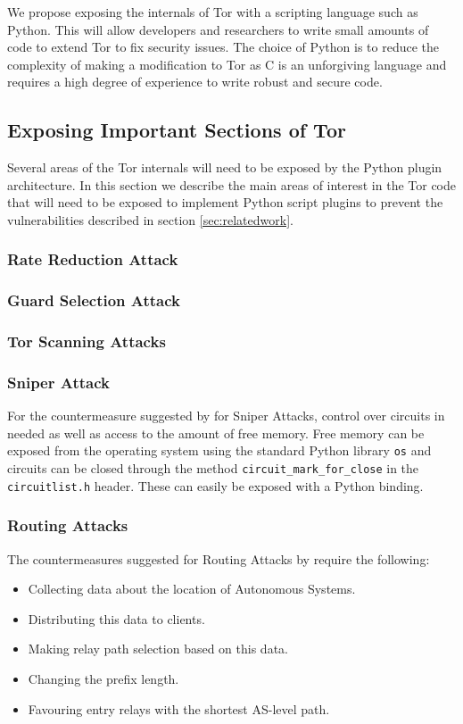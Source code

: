 \documentclass[9pt,technote]{IEEEtran}
\begin{document}
We propose exposing the internals of Tor with a scripting language such as
Python. This will allow developers and researchers to write small amounts of
code to extend Tor to fix security issues. The choice of Python is to reduce the complexity of making a modification to Tor as C is an unforgiving language and requires a high degree of experience to write robust and secure code.

\subsection{Exposing Important Sections of Tor}
Several areas of the Tor internals will need to be exposed by the Python plugin
architecture. In this section we describe the main areas of interest in the Tor
code that will need to be exposed to implement Python script plugins to prevent
the vulnerabilities described in section \ref{sec:relatedwork}.\\

\subsubsection{Rate Reduction Attack}

\subsubsection{Guard Selection Attack}

\subsubsection{Tor Scanning Attacks}

\subsubsection{Sniper Attack}
For the countermeasure suggested by \citeauthor{jansen2014sniper} for Sniper Attacks, control over circuits in needed as well as access to the amount of free memory. Free memory can be exposed from the operating system using the standard Python library \texttt{os} and circuits can
be closed through the method \texttt{circuit\_mark\_for\_close} in the
\texttt{circuitlist.h} header. These can easily be exposed with a Python
binding.\\

\subsubsection{Routing Attacks}
The countermeasures suggested for Routing Attacks by \citeauthor{sun2015raptor} require the following:
\begin{itemize}
\item Collecting data about the location of Autonomous Systems.
\item Distributing this data to clients.
\item Making relay path selection based on this data.
\item Changing the prefix length.
\item Favouring entry relays with the shortest AS-level path.
\end{itemize}
\end{document}
